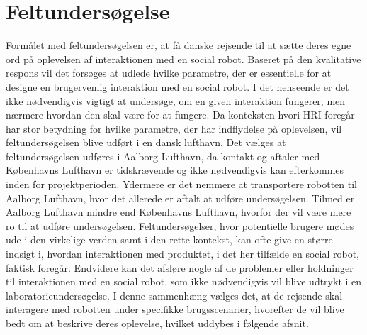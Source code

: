 \chapter{Feltundersøgelse}
\label{Feltundersoegelse}
%
Formålet med feltundersøgelsen er, at få danske rejsende til at sætte deres egne ord på oplevelsen af interaktionen med en social robot. Baseret på den kvalitative respons vil det forsøges at udlede hvilke parametre, der er essentielle for at designe en brugervenlig interaktion med en social robot. I det henseende er det ikke nødvendigvis vigtigt at undersøge, om en given interaktion fungerer, men nærmere hvordan den skal være for at fungere. Da konteksten hvori HRI foregår har stor betydning for hvilke parametre, der har indflydelse på oplevelsen, vil feltundersøgelsen blive udført i en dansk lufthavn. Det vælges at feltundersøgelsen udføres i Aalborg Lufthavn, da kontakt og aftaler med Københavns Lufthavn er tidskrævende og ikke nødvendigvis kan efterkommes inden for projektperioden. Ydermere er det nemmere at transportere robotten til Aalborg Lufthavn, hvor det allerede er aftalt at udføre undersøgelsen. Tilmed er Aalborg Lufthavn mindre end Københavns Lufthavn, hvorfor der vil være mere ro til at udføre undersøgelsen.\blankline
%
Feltundersøgelser, hvor potentielle brugere mødes ude i den virkelige verden samt i den rette kontekst, kan ofte give en større indsigt i, hvordan interaktionen med produktet, i det her tilfælde en social robot, faktisk foregår. Endvidere kan det afsløre nogle af de problemer eller holdninger til interaktionen med en social robot, som ikke nødvendigvis vil blive udtrykt i en laboratorieundersøgelse. I denne sammenhæng vælges det, at de rejsende skal interagere med robotten under specifikke brugsscenarier, hvorefter de vil blive bedt om at beskrive deres oplevelse, hvilket uddybes i følgende afsnit.   
